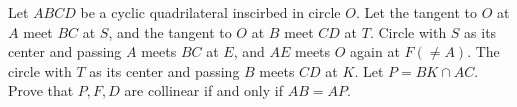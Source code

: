 Let $ABCD$ be a cyclic quadrilateral inscirbed in circle $O$. Let the tangent to $O$ at $A$ meet $BC$ at $S$, and the tangent to $O$ at $B$ meet $CD$ at $T$. Circle with $S$ as its center and passing $A$ meets $BC$ at $E$, and $AE$ meets $O$ again at $F(\ne A)$. The circle with $T$ as its center and passing $B$ meets $CD$ at $K$. Let $P = BK \cap AC$. Prove that $P,F,D$ are collinear if and only if $AB = AP$.
